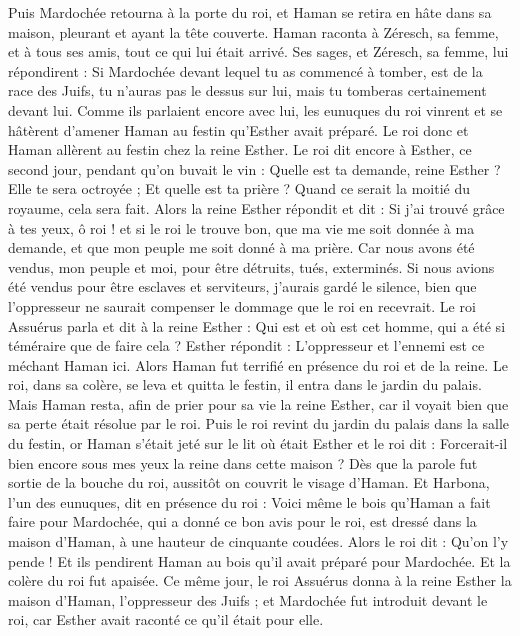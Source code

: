 \begin{multicols}{2}
Puis Mardochée retourna à la porte du roi, et Haman se retira en hâte dans sa maison, pleurant et ayant la tête couverte.
Haman raconta à Zéresch, sa femme, et à tous ses amis, tout ce qui lui était arrivé. Ses sages, et Zéresch, sa femme, lui répondirent : Si Mardochée devant lequel tu as commencé à tomber, est de la race des Juifs, tu n'auras pas le dessus sur lui, mais tu tomberas certainement devant lui.
Comme ils parlaient encore avec lui, les eunuques du roi vinrent et se hâtèrent d'amener Haman au festin qu'Esther avait préparé.
\VerseOne{}Le roi donc et Haman allèrent au festin chez la reine Esther.
Le roi dit encore à Esther, ce second jour, pendant qu'on buvait le vin : Quelle est ta demande, reine Esther ? Elle te sera octroyée ; Et quelle est ta prière ? Quand ce serait la moitié du royaume, cela sera fait.
Alors la reine Esther répondit et dit : Si j'ai trouvé grâce à tes yeux, ô roi ! et si le roi le trouve bon, que ma vie me soit donnée à ma demande, et que mon peuple me soit donné à ma prière.
Car nous avons été vendus, mon peuple et moi, pour être détruits, tués, exterminés. Si nous avions été vendus pour être esclaves et serviteurs, j'aurais gardé le silence, bien que l'oppresseur ne saurait compenser le dommage que le roi en recevrait.
Le roi Assuérus parla et dit à la reine Esther : Qui est et où est cet homme, qui a été si téméraire que de faire cela ?
Esther répondit : L'oppresseur et l'ennemi est ce méchant Haman ici. Alors Haman fut terrifié en présence du roi et de la reine.
Le roi, dans sa colère, se leva et quitta le festin, il entra dans le jardin du palais. Mais Haman resta, afin de prier pour sa vie la reine Esther, car il voyait bien que sa perte était résolue par le roi.
Puis le roi revint du jardin du palais dans la salle du festin, or Haman s'était jeté sur le lit où était Esther et le roi dit : Forcerait-il bien encore sous mes yeux la reine dans cette maison ? Dès que la parole fut sortie de la bouche du roi, aussitôt on couvrit le visage d'Haman.
Et Harbona, l'un des eunuques, dit en présence du roi : Voici même le bois qu'Haman a fait faire pour Mardochée, qui a donné ce bon avis pour le roi, est dressé dans la maison d'Haman, à une hauteur de cinquante coudées. Alors le roi dit : Qu'on l'y pende !
Et ils pendirent Haman au bois qu'il avait préparé pour Mardochée. Et la colère du roi fut apaisée.
\VerseOne{}Ce même jour, le roi Assuérus donna à la reine Esther la maison d'Haman, l'oppresseur des Juifs ; et Mardochée fut introduit devant le roi, car Esther avait raconté ce qu'il était pour elle.

\end{multicols}
